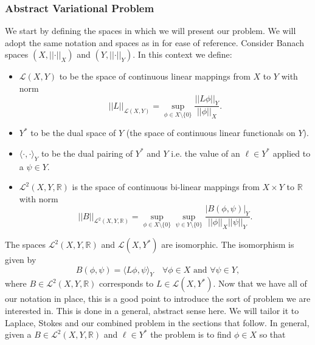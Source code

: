 \documentclass[12pt,a4paper]{article}
\theoremstyle{definition}
\begin{document}
\subsubsection{Abstract Variational Problem}\label{subsec_verf_abst_var_prob}
We start by defining the spaces in which we will present our problem.  We will adopt the same notation and spaces as in \cite[\S4.1.1]{verfurth2013posteriori} for ease of reference.  Consider Banach spaces $\left(X,\left|\left|\cdot\right|\right|_X\right)$ and $\left(Y,\left|\left|\cdot\right|\right|_Y\right)$. In this context we  define:
\begin{itemize}
	\item $\mathcal{L}\left(X,Y\right)$ to be the space of continuous linear mappings from $X$ to $Y$ with norm 
	\begin{equation}
	\left|\left|L\right|\right|_{\mathcal{L}\left(X,Y\right)} = \sup_{\phi \in X\setminus\lbrace 0\rbrace}\frac{\left|\left|L\phi\right|\right|_Y}{\left|\left|\phi\right|\right|_X}.
	\end{equation}
	\item $Y^*$ to be the dual space of $Y$ (the space of continuous linear functionals on $Y$).
	\item $\langle \cdot,\cdot\rangle_Y$ to be the dual pairing of $Y^*$ and $Y$ i.e. the value of an $\ell\in Y^*$ applied to a $\psi\in Y $.
	\item $\mathcal{L}^2\left(X,Y,\mathbb{R}\right)$ is the space of continuous bi-linear mappings from $X\times Y$ to $\mathbb{R}$ with norm
	\begin{equation}
	\left|\left|B\right|\right|_{\mathcal{L}^2\left(X,Y,\mathbb{R}\right)} = \sup_{\phi \in X\setminus\lbrace 0\rbrace}\sup_{\psi \in Y\setminus\lbrace 0\rbrace}\frac{\left|B\left(\phi,\psi\right)\right|_Y}{\left|\left|\phi\right|\right|_X\left|\left|\psi\right|\right|_Y}.
	\end{equation}
\end{itemize}
The spaces $\mathcal{L}^2\left(X,Y,\mathbb{R}\right)$ and $\mathcal{L}\left(X,Y^*\right)$ are isomorphic.  The isomorphism is given by 
\begin{equation}\label{verf_isomorphism}
B\left(\phi,\psi\right)=\langle L\phi,\psi\rangle_Y\quad \forall \phi \in X\text{ and }\forall \psi \in Y,
\end{equation}
where $B\in \mathcal{L}^2\left(X,Y,\mathbb{R}\right)$ corresponds to $L\in \mathcal{L}\left(X,Y^*\right)$.  Now that we have all of our notation in place, this is a good point to introduce the sort of problem we are interested in.  This is done in a general, abstract sense here.  We will tailor it to Laplace, Stokes and our combined problem in the sections that follow.  In general, given a $B\in \mathcal{L}^2\left(X,Y,\mathbb{R}\right)$ and $\ell \in Y^*$ the problem is to find $\phi \in X$ so that 
\end{document}
